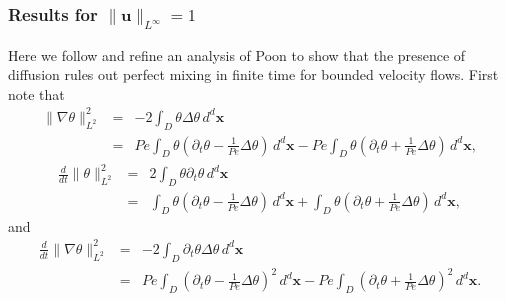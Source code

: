 \documentclass[12pt]{iopart}
\newcommand{\ddt}[1]{\frac{d #1}{dt}}
\newcommand{\ltwo}[1]{\|#1\|_{L^{2}}}
\newcommand{\hone}[1]{\| \nabla #1\|_{L^{2}}}
\newcommand{\sint}[1]{\int_{D} #1 \, d^{d}\mathbf{x}}
\newcommand{\linf}[1]{\| #1 \|_{L^{\infty}}}
\renewcommand{\u}{\mathbf{u}}
\newcommand{\ppt}[1]{\partial_{t} #1}
\newcommand{\lap}{\Delta }
\begin{document}
\subsubsection{Results for $\linf{\u}= 1$}
Here we follow and refine an analysis of Poon \cite{Chi-Cheu1996} to show that the presence of diffusion rules out perfect mixing in finite time for bounded velocity flows.  First note that
%
\begin{eqnarray*}
	 \hone{\theta}^2 &=& - 2\sint{\theta \lap \theta} \\
	 							&=& Pe \sint{\theta\left(\ppt{\theta}
	 									-\frac{1}{Pe}\lap \theta\right)} 
	 									-Pe \sint{\theta\left(\ppt{\theta}
	 									+\frac{1}{Pe}\lap \theta\right)},
\end{eqnarray*}
%
\begin{eqnarray*}
	\ddt{}\ltwo{\theta}^2 &=& 2\sint{\theta\ppt{\theta}} \\
										 &=&\sint{\theta\left(\ppt{\theta}
	 									-\frac{1}{Pe}\lap \theta\right)} 
										 + \sint{\theta\left(\ppt{\theta}
	 									+\frac{1}{Pe}\lap \theta\right)} ,
\end{eqnarray*}
%
and
%
\begin{eqnarray*}
	\ddt{}\hone{\theta}^2 &=& -2\sint{\ppt{\theta}\lap \theta} \\
	 									&=& Pe \sint{\left(\ppt{\theta}
	 									-\frac{1}{Pe}\lap \theta\right)^2} 
	 									-Pe \sint{\left(\ppt{\theta}
	 									+\frac{1}{Pe}\lap \theta\right)^2} .
\end{eqnarray*}
\end{document}
